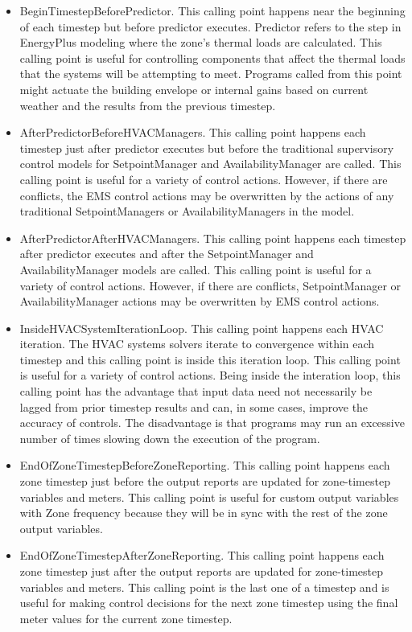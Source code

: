 \begin{itemize}
\item
  BeginTimestepBeforePredictor. This calling point happens near the beginning of each timestep but before predictor executes. Predictor refers to the step in EnergyPlus modeling where the zone's thermal loads are calculated. This calling point is useful for controlling components that affect the thermal loads that the systems will be attempting to meet. Programs called from this point might actuate the building envelope or internal gains based on current weather and the results from the previous timestep.
\item
  AfterPredictorBeforeHVACManagers. This calling point happens each timestep just after predictor executes but before the traditional supervisory control models for SetpointManager and AvailabilityManager are called. This calling point is useful for a variety of control actions. However, if there are conflicts, the EMS control actions may be overwritten by the actions of any traditional SetpointManagers or AvailabilityManagers in the model.
\item
  AfterPredictorAfterHVACManagers. This calling point happens each timestep after predictor executes and after the SetpointManager and AvailabilityManager models are called. This calling point is useful for a variety of control actions. However, if there are conflicts, SetpointManager or AvailabilityManager actions may be overwritten by EMS control actions.
\item
  InsideHVACSystemIterationLoop. This calling point happens each HVAC iteration. The HVAC systems solvers iterate to convergence within each timestep and this calling point is inside this iteration loop. This calling point is useful for a variety of control actions. Being inside the interation loop, this calling point has the advantage that input data need not necessarily be lagged from prior timestep results and can, in some cases, improve the accuracy of controls. The disadvantage is that programs may run an excessive number of times slowing down the execution of the program.
\item
  EndOfZoneTimestepBeforeZoneReporting. This calling point happens each zone timestep just before the output reports are updated for zone-timestep variables and meters. This calling point is useful for custom output variables with Zone frequency because they will be in sync with the rest of the zone output variables.
\item
  EndOfZoneTimestepAfterZoneReporting. This calling point happens each zone timestep just after the output reports are updated for zone-timestep variables and meters. This calling point is the last one of a timestep and is useful for making control decisions for the next zone timestep using the final meter values for the current zone timestep.

\end{itemize}
